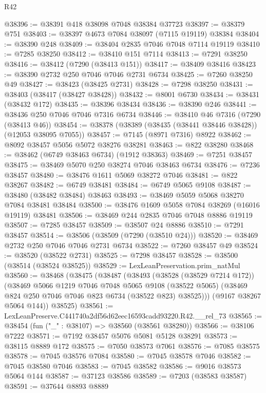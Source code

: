 \begin{lexlean}{R42}
\begin{coremodule}
{@38396 := @38391 @418 @38098 @7048 @38384 @37723
@38397 := @38379 @751
@38403 := @38397 @4673 @7084 @38097 (@7115 @19119) @38384
@38404 := @38390 @248
@38409 := @38404 @2835 @7046 @7048 @7114 @19119
@38410 := @7285 @38250
@38412 := @38410 @151 @7114
@38413 := @7291 @38250
@38416 := @38412 (@7290 (@38413 @151))
@38417 := @38409 @38416
@38423 := @38390 @2732 @250 @7046 @7046 @2731 @6734
@38425 := @7260 @38250 @49
@38427 := @38423 (@38425 @2731)
@38428 := @7298 @38250
@38431 := @38403 (@38417 (@38427 @38428))
@38432 := @8001 @6730
@38434 := @38431 (@38432 @172)
@38435 := @38396 @38434
@38436 := @38390 @246
@38441 := @38436 @250 @7046 @7046 @7316 @6734
@38446 := @38410 @46 @7316 (@7290 (@38413 @46))
@38454 := @38378 (@38389 (@38435 (@38441 @38446 @38428)) (@12053 @38095 @7055))
@38457 := @7145 (@8971 @7316) @8922
@38462 := @8092 @38457 @5056 @5072 @38276 @38281
@38463 := @822 @38280
@38468 := @38462 (@6749 @38463 @6734) (@1912 @38363)
@38469 := @7251 @38457
@38475 := @38469 @5070 @250 @38274 @7046 @38463 @6734
@38476 := @7236 @38457
@38480 := @38476 @1611 @5069 @38272 @7046
@38481 := @822 @38267
@38482 := @6749 @38481
@38484 := @6749 @5065 @9108
@38487 := @38480 (@38482 @38484) @38463
@38493 := @38469 @5059 @5068 @38270 @7084 @38481 @38484
@38500 := @38476 @1609 @5058 @7084 @38269 (@16016 @19119) @38481
@38506 := @38469 @244 @2835 @7046 @7048 @8886 @19119
@38507 := @7285 @38457
@38509 := @38507 @24 @8886
@38510 := @7291 @38457
@38514 := @38506 (@38509 (@7290 (@38510 @24)))
@38520 := @38469 @2732 @250 @7046 @7046 @2731 @6734
@38522 := @7260 @38457 @49
@38524 := @38520 (@38522 @2731)
@38525 := @7298 @38457
@38528 := @38500 (@38514 (@38524 @38525))
@38529 := LexLeanPreservation.prim_natMul
@38560 := @38468
    (@38475
      (@38487
        (@38493
          (@38528 (@38529 @7214 @172))
          (@38469
            @5066
            @1219
            @7046
            @7048
            @5065
            @9108
            (@38522 @5065)
            (@38469 @824 @250 @7046 @7046 @823 @6734 (@38522 @823) @38525)))
        (@9167 @38267 @5064 @144))
      @38525)
@38561 := LexLeanPreserve.C441740a2df56d62eec16593cadd93220.R42.__rel_73
@38565 := @38454 (fun ("_" : @38107) => @38560 (@38561 @38280))
@38566 := @38106 @7222
@38571 := @7192 @38457 @5076 @5081 @5128 @38291
@38573 := @38115 @8889 @172
@38575 := @7050 @38573 @7061
@38576 := @7085 @38575
@38578 := @7045 @38576 @7084
@38580 := @7045 @38578 @7046
@38582 := @7045 @38580 @7046
@38583 := @7045 @38582
@38586 := @9016 @38573 @5064 @144
@38587 := @37123 @38586
@38589 := @7203 (@38583 @38587)
@38591 := @37644 @8893 @8889
}
\end{coremodule}
\end{lexlean}
